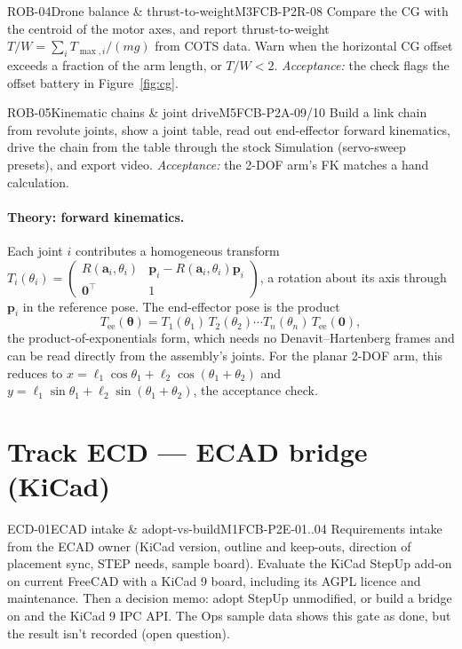 \begin{epic}{ROB-04}{Drone balance \& thrust-to-weight}{M3}{\stTodo}{FCB-P2R-08}
Compare the CG with the centroid of the motor axes, and report thrust-to-weight
$T/W=\sum_i T_{\max,i}/(m g)$ from COTS data. Warn when the horizontal CG offset exceeds a fraction of the
arm length, or $T/W<2$.
\emph{Acceptance:} the check flags the offset battery in Figure~\ref{fig:cg}.
\end{epic}

\begin{epic}{ROB-05}{Kinematic chains \& joint drive}{M5}{\stTodo}{FCB-P2A-09/10}
Build a link chain from revolute joints, show a joint table, read out end-effector forward kinematics, drive
the chain from the table through the stock Simulation (servo-sweep presets), and export video.
\emph{Acceptance:} the 2-DOF arm's FK matches a hand calculation.
\end{epic}

\paragraph{Theory: forward kinematics.} Each joint $i$ contributes a homogeneous transform
$T_i(\theta_i)=\begin{pmatrix}R(\mathbf a_i,\theta_i)&\mathbf p_i-R(\mathbf a_i,\theta_i)\mathbf p_i\\
\mathbf 0^{\!\top}&1\end{pmatrix}$, a rotation about its axis through $\mathbf p_i$ in the reference pose.
The end-effector pose is the product
\[
  T_{\text{ee}}(\boldsymbol\theta)=T_1(\theta_1)\,T_2(\theta_2)\cdots T_n(\theta_n)\,T_{\text{ee}}(\mathbf 0),
\]
the product-of-exponentials form, which needs no Denavit--Hartenberg frames and can be read directly from the
assembly's joints. For the planar 2-DOF arm, this reduces to
$x=\ell_1\cos\theta_1+\ell_2\cos(\theta_1+\theta_2)$ and $y=\ell_1\sin\theta_1+\ell_2\sin(\theta_1+\theta_2)$,
the acceptance check.

\section{Track ECD --- ECAD bridge (KiCad)}\label{sec:ecd}

\begin{epic}{ECD-01}{ECAD intake \& adopt-vs-build}{M1}{\stTodo}{FCB-P2E-01..04}
Requirements intake from the ECAD owner (KiCad version, outline and keep-outs, direction of placement sync,
STEP needs, sample board). Evaluate the KiCad StepUp add-on on current FreeCAD with a KiCad 9 board,
including its AGPL licence and maintenance. Then a decision memo: adopt StepUp unmodified, or build a bridge on
 and the KiCad 9 IPC API. The Ops sample data shows this gate as done, but the result isn't
recorded (open question).
\end{epic}

